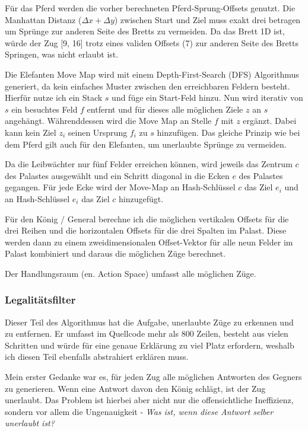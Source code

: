 \documentclass{jpp}
\begin{document}
Für das Pferd werden die vorher berechneten Pferd-Sprung-Offsets genutzt. Die Manhattan Distanz ($\Delta x + \Delta y$) zwischen Start und Ziel muss exakt drei betragen um Sprünge zur anderen Seite des Bretts zu vermeiden. Da das Brett 1D ist, würde der Zug [9, 16] trotz eines validen Offsets (7) zur anderen Seite des Bretts Springen, was nicht erlaubt ist.

Die Elefanten Move Map wird mit einem Depth-First-Search (DFS) Algorithmus generiert, da kein einfaches Muster zwischen den erreichbaren Feldern besteht. Hierfür nutze ich ein Stack $s$ und füge ein Start-Feld hinzu. Nun wird iterativ von $s$ ein besuchtes Feld $f$ entfernt und für dieses alle möglichen Ziele $z$ an $s$ angehängt. Währenddessen wird die Move Map an Stelle $f$ mit $z$ ergänzt. Dabei kann kein Ziel $z_i$ seinen Ursprung $f_i$ zu $s$ hinzufügen. Das gleiche Prinzip wie bei dem Pferd gilt auch für den Elefanten, 
um unerlaubte Sprünge zu vermeiden.

Da die Leibwächter nur fünf Felder erreichen können, wird jeweils das Zentrum $c$ des Palastes ausgewählt und ein Schritt diagonal in die Ecken $e$ des Palastes gegangen. Für jede Ecke wird der Move-Map an Hash-Schlüssel $c$ das Ziel $e_i$ und an Hash-Schlüssel $e_i$ das Ziel $c$ hinzugefügt.

Für den König / General berechne ich die möglichen vertikalen Offsets für die drei Reihen und die horizontalen Offsets für die drei Spalten im Palast. Diese werden dann zu einem zweidimensionalen Offset-Vektor für alle neun Felder im Palast kombiniert und daraus die möglichen Züge berechnet. 

Der Handlungsraum (en. Action Space) umfasst alle möglichen Züge.

\subsubsection{Legalitätsfilter}
Dieser Teil des Algorithmus hat die Aufgabe, unerlaubte Züge zu erkennen und zu entfernen. Er umfasst im Quellcode mehr als 800 Zeilen, besteht aus vielen Schritten und würde für eine genaue Erklärung zu viel Platz erfordern, weshalb ich diesen Teil ebenfalls abstrahiert erklären muss.

Mein erster Gedanke war es, für jeden Zug alle möglichen Antworten des Gegners zu generieren. Wenn eine Antwort davon den König schlägt, ist der Zug unerlaubt. Das Problem ist hierbei aber nicht nur die offensichtliche Ineffizienz, sondern vor allem die Ungenauigkeit - \textit{Was ist, wenn diese Antwort selber unerlaubt ist?}
\end{document}
